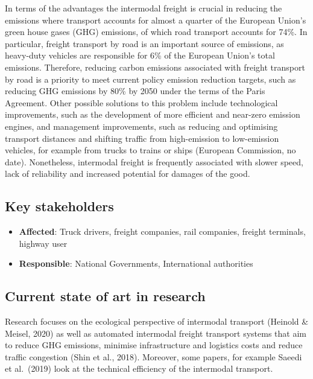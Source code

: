 \documentclass[
]{book}
\providecommand{\tightlist}{%
  \setlength{\itemsep}{0pt}\setlength{\parskip}{0pt}}
\begin{document}
In terms of the advantages the intermodal freight is crucial in reducing the emissions where transport accounts for almost a quarter of the European Union's green house gases (GHG) emissions, of which road transport accounts for 74\%. In particular, freight transport by road is an important source of emissions, as heavy-duty vehicles are responsible for 6\% of the European Union's total emissions. Therefore, reducing carbon emissions associated with freight transport by road is a priority to meet current policy emission reduction targets, such as reducing GHG emissions by 80\% by 2050 under the terms of the Paris Agreement. Other possible solutions to this problem include technological improvements, such as the development of more efficient and near-zero emission engines, and management improvements, such as reducing and optimising transport distances and shifting traffic from high-emission to low-emission vehicles, for example from trucks to trains or ships (European Commission, no date). Nonetheless, intermodal freight is frequently associated with slower speed, lack of reliability and increased potential for damages of the good.

\hypertarget{key-stakeholders-19}{%
\subsection*{Key stakeholders}\label{key-stakeholders-19}}

\begin{itemize}
\tightlist
\item
  \textbf{Affected}: Truck drivers, freight companies, rail companies, freight terminals, highway user
\item
  \textbf{Responsible}: National Governments, International authorities
\end{itemize}

\hypertarget{current-state-of-art-in-research-19}{%
\subsection*{Current state of art in research}\label{current-state-of-art-in-research-19}}

Research focuses on the ecological perspective of intermodal transport (Heinold \& Meisel, 2020) as well as automated intermodal freight transport systems that aim to reduce GHG emissions, minimise infrastructure and logistics costs and reduce traffic congestion (Shin et al., 2018). Moreover, some papers, for example Saeedi et al.~(2019) look at the technical efficiency of the intermodal transport.
\end{document}
